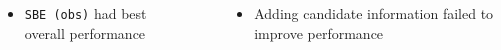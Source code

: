 
\begin{columns}[t,totalwidth=\twocolwid]

\begin{column}{\onecolwid}
	
	\large{
	  \begin{itemize}
			\item \texttt{SBE (obs)} had best overall performance
		\end{itemize}}

\end{column}

\begin{column}{\sepwid}
\end{column} %

\begin{column}{\onecolwid}
	
	\large{
	  \begin{itemize}
			\item Adding candidate information failed to improve performance
		\end{itemize}}

\end{column}

\end{columns}